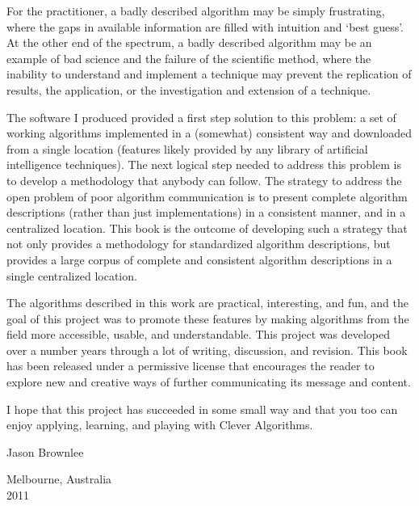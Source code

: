 For the practitioner, a badly described algorithm may be simply frustrating, where the gaps in available information are filled with intuition and `best guess'. At the other end of the spectrum, a badly described algorithm may be an example of bad science and the failure of the scientific method, where the inability to understand and implement a technique may prevent the replication of results, the application, or the investigation and extension of a technique. 

The software I produced provided a first step solution to this problem: a set of working algorithms implemented in a (somewhat) consistent way and downloaded from a single location (features likely provided by any library of artificial intelligence techniques). The next logical step needed to address this problem is to develop a methodology that anybody can follow. The strategy to address the open problem of poor algorithm communication is to present complete algorithm descriptions (rather than just implementations) in a consistent manner, and in a centralized location.
This book is the outcome of developing such a strategy that not only provides a methodology for standardized algorithm descriptions, but provides a large corpus of complete and consistent algorithm descriptions in a single centralized location. 

The algorithms described in this work are practical, interesting, and fun, and the goal of this project was to promote these features by making algorithms from the field more accessible, usable, and understandable.
This project was developed over a number years through a lot of writing, discussion, and revision. This book has been released under a permissive license that encourages the reader to explore new and creative ways of further communicating its message and content.

I hope that this project has succeeded in some small way and that you too can enjoy applying, learning, and playing with Clever Algorithms.

\begin{flushright}
\vspace{1in}
Jason Brownlee
\end{flushright}

\begin{flushleft}
\vspace{0.2in}
Melbourne, Australia \\
2011
\end{flushleft}
